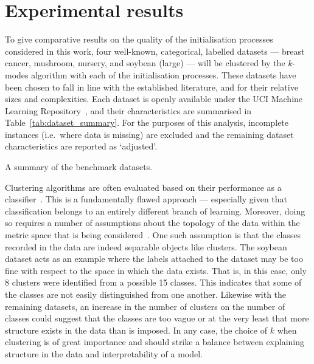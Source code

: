 \section{Experimental results}\label{sec:results}

To give comparative results on the quality of the initialisation processes
considered in this work, four well-known, categorical, labelled datasets ---
breast cancer, mushroom, nursery, and soybean (large) --- will be clustered by
the \(k\)-modes algorithm with each of the initialisation processes. These
datasets have been chosen to fall in line with the established literature, and
for their relative sizes and complexities. Each dataset is openly available
under the UCI Machine Learning Repository~\cite{Dua2019}, and their
characteristics are summarised in Table~\ref{tab:dataset_summary}. For the
purposes of this analysis, incomplete instances (i.e.\ where data is missing)
are excluded and the remaining dataset characteristics are reported as
`adjusted'.

\begin{table}[htbp]
    \resizebox{\textwidth}{!}{%
        
    }\caption{A summary of the benchmark datasets.}\label{tab:dataset_summary}
\end{table}

Clustering algorithms are often evaluated based on their performance as a
classifier~\cite{%
    Arthur2007,Cao2009,Cao2012,Huang1998,%
    Ng2007,Olaode2014,Schaeffer2007,Sharma2015%
}. This is a fundamentally flawed approach --- especially given that
classification belongs to an entirely different branch of learning.  Moreover,
doing so requires a number of assumptions about the topology of the data within
the metric space that is being considered~\cite{Memoli2011}.  One such
assumption is that the classes recorded in the data are indeed separable objects
like clusters. The soybean dataset acts as an example where the labels attached
to the dataset may be too fine with respect to the space in which the data
exists. That is, in this case, only 8 clusters were identified from a possible
15 classes. This indicates that some of the classes are not easily distinguished
from one another. Likewise with the remaining datasets, an increase in the
number of clusters on the number of classes could suggest that the classes are
too vague or at the very least that more structure exists in the data than is
imposed. In any case, the choice of \(k\) when clustering is of great importance
and should strike a balance between explaining structure in the data and
interpretability of a model.

